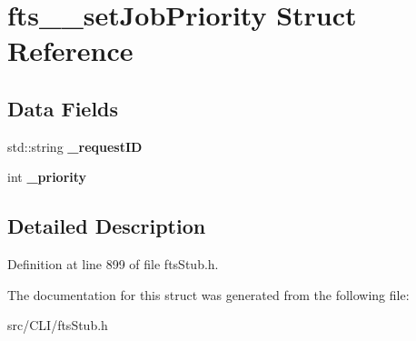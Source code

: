 \section{fts\_\-\_\-setJobPriority Struct Reference}
\label{structfts____setJobPriority}
\subsection*{Data Fields}
\begin{DoxyCompactItemize}
\item 
std::string {\bfseries \_\-requestID}\label{structfts____setJobPriority_a56924daa1f1b089328fef52cf4ecabd9}

\item 
int {\bfseries \_\-priority}\label{structfts____setJobPriority_a7861926d77a2ca5eaaae8ff0dc5ce6e2}

\end{DoxyCompactItemize}


\subsection{Detailed Description}


Definition at line 899 of file ftsStub.h.



The documentation for this struct was generated from the following file:\begin{DoxyCompactItemize}
\item 
src/CLI/ftsStub.h\end{DoxyCompactItemize}
